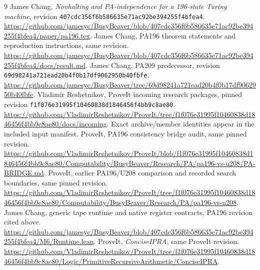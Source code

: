 \clearpage
\begingroup\raggedright
\begin{thebibliography}{9}
James Chang, \emph{Nonhalting and PA-independence for a 196-state Turing
machine}, revision \texttt{407cdc356f6b586635e71ac92be394255f4bfea4}.
\url{https://github.com/jamesyc/BusyBeaver/blob/407cdc356f6b586635e71ac92be394255f4bfea4/paper/pa196.tex}.
James Chang, PA196 theorem statements and reproduction instructions, same
revision.
\url{https://github.com/jamesyc/BusyBeaver/blob/407cdc356f6b586635e71ac92be394255f4bfea4/docs/result.md}.
James Chang, PA209 predecessor, revision
\texttt{69d98241a721ead20b4f0b17df9062950b40fbfe}.
\url{https://github.com/jamesyc/BusyBeaver/tree/69d98241a721ead20b4f0b17df9062950b40fbfe}.
Vladimir Reshetnikov, ProveIt incoming research packages, pinned revision
\texttt{f1f076e31995f10460838d1846456f4bb9c8ae80}.
\url{https://github.com/VladimirReshetnikov/ProveIt/tree/f1f076e31995f10460838d1846456f4bb9c8ae80/docs/incoming}.
Exact archive/member identities appear in the included input manifest.
ProveIt, PA196 consistency bridge audit, same pinned revision.
\url{https://github.com/VladimirReshetnikov/ProveIt/blob/f1f076e31995f10460838d1846456f4bb9c8ae80/Computability/BusyBeaver/Research/PA/pa196-vs-u208/PA-BRIDGE.md}.
ProveIt, earlier PA196/U208 comparison and recorded search boundaries, same
pinned revision.
\url{https://github.com/VladimirReshetnikov/ProveIt/tree/f1f076e31995f10460838d1846456f4bb9c8ae80/Computability/BusyBeaver/Research/PA/pa196-vs-u208}.
James Chang, generic tape runtime and native register contracts, PA196
revision cited above.
\url{https://github.com/jamesyc/BusyBeaver/blob/407cdc356f6b586635e71ac92be394255f4bfea4/M6/Runtime.lean}.
ProveIt, \emph{ConciseIPRA}, same ProveIt revision.
\url{https://github.com/VladimirReshetnikov/ProveIt/tree/f1f076e31995f10460838d1846456f4bb9c8ae80/Logic/PrimitiveRecursiveArithmetic/ConciseIPRA}.
\end{thebibliography}
\endgroup
